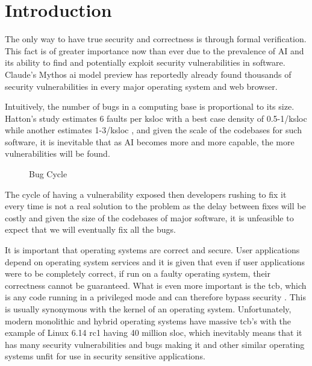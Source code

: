 \documentclass[../thesis.tex]{subfiles}
\begin{document}
\section{Introduction}
    The only way to have true security and correctness is through formal verification. This fact is of greater importance now than ever due to the prevalence of AI and its ability to find and potentially exploit security vulnerabilities in software. Claude's Mythos \gls{ai} model preview has reportedly already found thousands of security vulnerabilities in every major operating system and web browser.
    
    Intuitively, the number of bugs in a computing base is proportional to its size. Hatton's study estimates 6 faults per k\gls{sloc} with a best case density of 0.5-1/k\gls{sloc} \citep{Hatton_97} while another estimates 1-3/k\gls{sloc} \citep{Mohagheghi_CKS_04}, and given the scale of the codebases for such software, it is inevitable that as AI becomes more and more capable, the more vulnerabilities will be found. 
    \begin{figure}[H]
        \centering
        \resizebox{\textwidth}{!}{
            
        }
        \caption{Bug Cycle}
        \label{Bug Cycle}
    \end{figure}
    The cycle of having a vulnerability exposed then developers rushing to fix it every time is not a real solution to the problem as the delay between fixes will be costly and given the size of the codebases of major software, it is unfeasible to expect that we will eventually fix all the bugs.

    It is important that operating systems are correct and secure. User applications depend on operating system services and it is given that even if user applications were to be completely correct, if run on a faulty operating system, their correctness cannot be guaranteed. What is even more important is the \gls{tcb}, which is any code running in a privileged mode and can therefore bypass security \citep{Rushby_81}. This is usually synonymous with the kernel of an operating system. Unfortunately, modern monolithic and hybrid operating systems have massive \gls{tcb}'s with the example of Linux 6.14 rc1 having 40 million \gls{sloc}, which inevitably means that it has many security vulnerabilities and bugs making it and other similar operating systems unfit for use in security sensitive applications.
\end{document}
